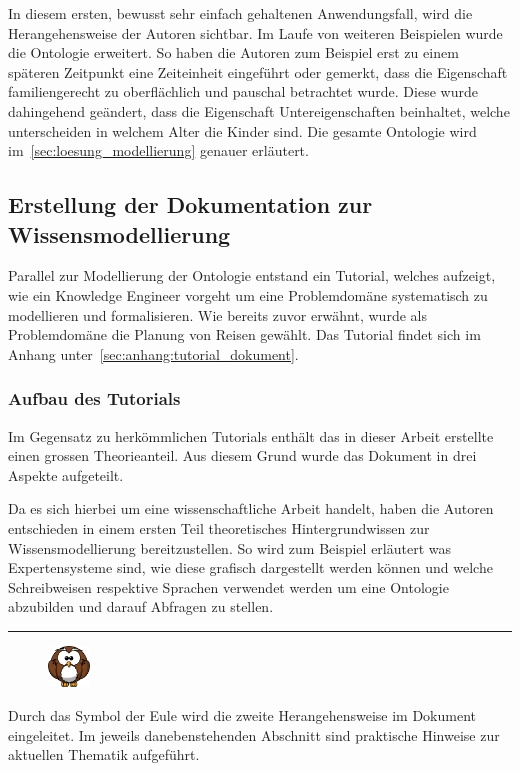In diesem ersten, bewusst sehr einfach gehaltenen Anwendungsfall, wird die Herangehensweise der Autoren sichtbar. Im Laufe von weiteren Beispielen wurde die Ontologie erweitert. So haben die Autoren zum Beispiel erst zu einem späteren Zeitpunkt eine Zeiteinheit eingeführt oder gemerkt, dass die Eigenschaft familiengerecht zu oberflächlich und pauschal betrachtet wurde. Diese wurde dahingehend geändert, dass die Eigenschaft Untereigenschaften beinhaltet, welche unterscheiden in welchem Alter die Kinder sind. Die gesamte Ontologie wird im~\autoref{sec:loesung_modellierung} genauer erläutert.

\subsection{Erstellung der Dokumentation zur Wissensmodellierung}
\label{subsec:dokumentation_wissensmodellierung}
Parallel zur Modellierung der Ontologie entstand ein Tutorial, welches aufzeigt, wie ein Knowledge Engineer vorgeht um eine Problemdomäne systematisch zu modellieren und formalisieren. Wie bereits zuvor erwähnt, wurde als Problemdomäne die Planung von Reisen gewählt. Das Tutorial findet sich im Anhang unter~\ref{sec:anhang:tutorial_dokument}.

\subsubsection{Aufbau des Tutorials}
\label{subsec:dokumentation_wissensmodellierung_aufbau}
Im Gegensatz zu herkömmlichen Tutorials enthält das in dieser Arbeit erstellte einen grossen Theorieanteil. Aus diesem Grund wurde das Dokument in drei Aspekte aufgeteilt.

Da es sich hierbei um eine wissenschaftliche Arbeit handelt, haben die Autoren entschieden in einem ersten Teil theoretisches Hintergrundwissen zur Wissensmodellierung bereitzustellen. So wird zum Beispiel erläutert was Expertensysteme sind, wie diese grafisch dargestellt werden können und welche Schreibweisen respektive Sprachen verwendet werden um eine Ontologie abzubilden und darauf Abfragen zu stellen.

\noindent\rule[1ex]{\textwidth}{1pt}
\begin{figure}
    \vspace{-18pt}
    \includegraphics[width=0.1\textwidth]{bilder/owl.png}\protect\footnotemark
\end{figure}
Durch das Symbol der Eule wird die zweite Herangehensweise im Dokument eingeleitet. Im jeweils danebenstehenden Abschnitt sind praktische Hinweise zur aktuellen Thematik aufgeführt.\\

